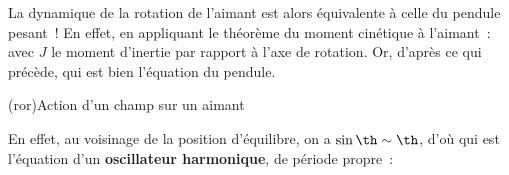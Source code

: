 \documentclass[../../main/main.tex]{subfiles}
\begin{document}
La dynamique de la rotation de l'aimant est alors équivalente à celle du pendule
pesant~! En effet, en appliquant le théorème du moment cinétique à l'aimant~:
\psw{%
	\[
		\dv{\Lc_z}{t} = J\tpp = \sum \Mc_z
	\]
}%
avec $J$ le moment d'inertie par rapport à l'axe de rotation. Or,
d'après ce qui précède,
%
qui est bien l'équation du pendule.
\begin{tcb*}(ror){Action d'un champ sur un aimant}
\end{tcb*}
En effet, au voisinage de
la position d'équilibre, on a $\sin{\th} \sim \th$, d'où
\psw{%
	\[
		\tpp + \frac{mB}{J}\th = 0
	\]
}%
qui est l'équation d'un \textbf{oscillateur harmonique}, de période propre~:
\psw{%
	\[
		T_0 = 2\pi \sqrt{\frac{J}{mB}}
	\]
}%
\end{document}
